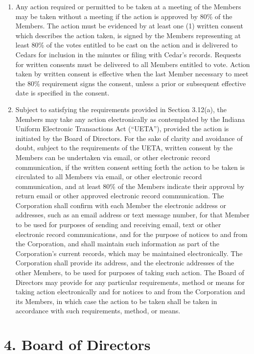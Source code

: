 \documentclass[
]{book}
\begin{document}
\begin{enumerate}
\def\labelenumi{\alph{enumi}.}
\item
  Any action required or permitted to be taken at a meeting of the Members may be taken without a meeting if the action is approved by 80\% of the Members. The action must be evidenced by at least one (1) written consent which describes the action taken, is signed by the Members representing at least 80\% of the votes entitled to be cast on the action and is delivered to Cedars for inclusion in the minutes or filing with Cedar's records. Requests for written consents must be delivered to all Members entitled to vote. Action taken by written consent is effective when the last Member necessary to meet the 80\% requirement signs the consent, unless a prior or subsequent effective date is specified in the consent.
\item
  Subject to satisfying the requirements provided in Section 3.12(a), the Members may take any action electronically as contemplated by the Indiana Uniform Electronic Transactions Act (``UETA''), provided the action is initiated by the Board of Directors. For the sake of clarity and avoidance of doubt, subject to the requirements of the UETA, written consent by the Members can be undertaken via email, or other electronic record communication, if the written consent setting forth the action to be taken is circulated to all Members via email, or other electronic record communication, and at least 80\% of the Members indicate their approval by return email or other approved electronic record communication. The Corporation shall confirm with each Member the electronic address or addresses, such as an email address or text message number, for that Member to be used for purposes of sending and receiving email, text or other electronic record communications, and for the purpose of notices to and from the Corporation, and shall maintain such information as part of the Corporation's current records, which may be maintained electronically. The Corporation shall provide its address, and the electronic addresses of the other Members, to be used for purposes of taking such action. The Board of Directors may provide for any particular requirements, method or means for taking action electronically and for notices to and from the Corporation and its Members, in which case the action to be taken shall be taken in accordance with such requirements, method, or means.
\end{enumerate}

\section{4. Board of Directors}\label{board-of-directors}
\end{document}
